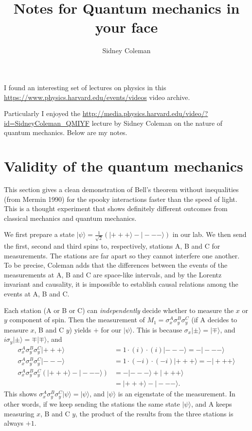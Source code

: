 \documentclass{article}
\begin{document}
\title{Notes for Quantum mechanics in your face}
\author{ Sidney Coleman }
\date{}
\maketitle

I found an interesting set of lectures on physics in this
\url{https://www.physics.harvard.edu/events/videos}
{video archive}.

Particularly I enjoyed the
\url{http://media.physics.harvard.edu/video/?id=SidneyColeman\_QMIYF}
{lecture by Sidney Coleman}
on the nature of quantum mechanics.
Below are my notes.

\section{Validity of the quantum mechanics}

This section gives a clean demonstration of Bell's theorem without inequalities (from Mermin 1990) for the spooky interactions faster than the speed of light.  This is a thought experiment that shows definitely different outcomes from classical mechanics and quantum mechanics.

We first prepare a state
$|\psi \rangle = \frac{1}{\sqrt{2}} \left(|+++\rangle - |---\rangle\right)$
in our lab.
We then send the first, second and third spins to,
respectively, stations A, B and C for measurements.
%
The stations are far apart so they cannot interfere one another.
%
To be precise, Coleman adds that the differences between the events
of the measurements at A, B and C are space-like intervals,
and by the Lorentz invariant and causality,
it is impossible to establish causal relations
among the events at A, B and C.

Each station (A or B or C) can \emph{independently} decide
whether to measure the $x$ or $y$ component of spin.
%
Then the measurement of $M_1 = \sigma^A_x \sigma^B_y \sigma^C_y$
(if A decides to measure $x$, B and C $y$)
yields $+$ for our $|\psi \rangle$.
This is because $\sigma_x|\pm\rangle = |\mp\rangle$,
and $i\sigma_y|\pm\rangle = \mp|\mp\rangle$, and
$$
\begin{aligned}
\sigma^A_x \sigma^B_y \sigma^C_y
 | + + + \rangle
&= 1\cdot (i) \cdot (i) | - - -\rangle = - | - - -\rangle \\
\sigma^A_x \sigma^B_y \sigma^C_y | - - -\rangle
&= 1\cdot (-i) \cdot (-i) | + + +\rangle = - | + + +\rangle \\
\sigma^A_x \sigma^B_y \sigma^C_y (| + + + \rangle - | - - - \rangle)
&= -| - - - \rangle + | + + + \rangle \\
&= | + + + \rangle - | - - - \rangle.
\end{aligned}
$$
This shows $\sigma^A_x \sigma^B_y \sigma^C_y |\psi\rangle = |\psi \rangle$,
and $|\psi\rangle$ is an eigenstate of the measurement.
In other words,
if we keep sending the stations the same state $|\psi\rangle$,
and A keeps measuring $x$, B and C $y$,
the product of the results from the three stations is always $+1$.
\end{document}
